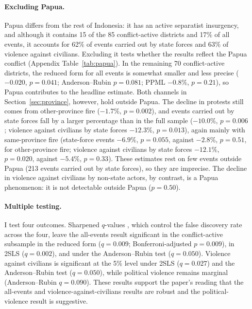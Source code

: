 \documentclass[12pt]{article}
\begin{document}
\paragraph{Excluding Papua.} Papua differs from the rest of Indonesia: it has an active separatist insurgency, and although it contains 15 of the 85 conflict-active districts and 17\% of all events, it accounts for 62\% of events carried out by state forces and 63\% of violence against civilians. Excluding it tests whether the results reflect the Papua conflict (Appendix Table~\ref{tab:papua}). In the remaining 70 conflict-active districts, the reduced form for all events is somewhat smaller and less precise ($-0.020$, $p=0.041$; Anderson--Rubin $p=0.081$; PPML $-0.8\%$, $p=0.21$), so Papua contributes to the headline estimate. Both channels in Section~\ref{sec:province}, however, hold outside Papua. The decline in protests still comes from other-province fire ($-1.7\%$, $p=0.002$), and events carried out by state forces fall by a larger percentage than in the full sample ($-10.0\%$, $p=0.006$; violence against civilians by state forces $-12.3\%$, $p=0.013$), again mainly with same-province fire (state-force events $-6.9\%$, $p=0.055$, against $-2.8\%$, $p=0.51$, for other-province fire; violence against civilians by state forces $-12.1\%$, $p=0.020$, against $-5.4\%$, $p=0.33$). These estimates rest on few events outside Papua (213 events carried out by state forces), so they are imprecise. The decline in violence against civilians by non-state actors, by contrast, is a Papua phenomenon: it is not detectable outside Papua ($p=0.50$).

\paragraph{Multiple testing.} I test four outcomes. Sharpened $q$-values \citep{benjamini2006adaptive,anderson2008multiple}, which control the false discovery rate across the four, leave the all-events result significant in the conflict-active subsample in the reduced form ($q=0.009$; Bonferroni-adjusted $p=0.009$), in 2SLS ($q=0.002$), and under the Anderson--Rubin test ($q=0.050$). Violence against civilians is significant at the 5\% level under 2SLS ($q=0.027$) and the Anderson--Rubin test ($q=0.050$), while political violence remains marginal (Anderson--Rubin $q=0.090$). These results support the paper's reading that the all-events and violence-against-civilians results are robust and the political-violence result is suggestive.
\end{document}
